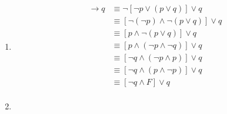 \documentclass[12pt letter]{report}
\begin{document}
{\begin{enumerate}
\begin{align*}
                                                & \equiv T \tag*{By the First Domination Law}                                    \\
          \end{align*}
    \item \begin{align*}
            [\neg p \vee \left( p \vee q \right) ] \to q & \equiv \neg \left[ \neg  p \vee \left( p \vee q \right)
            \right] \vee  q \tag*{Conditional Disjunction Equivalence}                                                                      \\
                                                         & \equiv \left[ \neg \left( \neg p \right) \wedge \neg
              \left( p \vee q \right)   \right] \vee  q \tag*{By the Second De
            Morgan's Law}                                                                                                                   \\
                                                         & \equiv \left[ p \wedge \neg \left( p \vee q \right)
            \right]  \vee q \tag*{By the Double Negation Law}                                                                               \\
                                                         & \equiv \left[ p \wedge \left( \neg p \wedge \neg q
            \right)   \right] \vee q \tag*{By the Second De Morgan's Law}                                                                   \\
                                                         & \equiv \left[ \neg q \wedge \left( \neg p \wedge p
              \right)   \right] \vee q \tag*{By the Second Associative
            Law}                                                                                                                            \\
                                                         & \equiv \left[ \neg q \wedge \left( p \wedge \neg p
              \right)   \right] \vee q \tag*{By the Second Commutative
            Law}                                                                                                                            \\
                                                         & \equiv \left[ \neg q \wedge F  \right] \vee  q \tag*{By the Second Negation Law} \\
          \end{align*}
    \item

\end{enumerate}}
\end{document}
